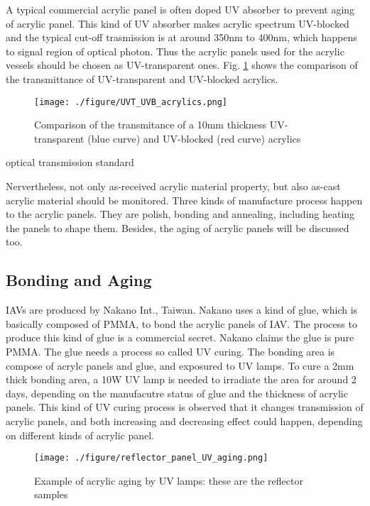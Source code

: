 A typical commercial acrylic panel is often doped UV absorber
to prevent aging of acrylic panel. This kind of UV absorber makes acrylic spectrum
UV-blocked and the typical cut-off trasmission is at around 350nm to 400nm,
which happens to signal region of optical photon.
Thus the acrylic panels used for the acrylic vessels should be chosen as
UV-transparent ones. Fig. \ref{UVTUVBAcrylics} shows the comparison of the transmittance of UV-transparent
and UV-blocked acrylics.


\begin{figure}
    \centering
    \texttt{[image: ./figure/UVT\_UVB\_acrylics.png]}
    \caption{Comparison of the transmitance of a 10mm thickness UV-transparent (blue curve) and UV-blocked (red curve) acrylics}
    \label{UVTUVBAcrylics}
    \end{figure}



optical transmission standard

Nervertheless, not only as-received acrylic material property, but also as-cast
acrylic material should be monitored. Three kinds of manufacture process happen to the acrylic panels.
They are polish, bonding and annealing, including heating the panels to shape them. Besides,
the aging of acrylic panels will be discussed too.

\subsection {Bonding and Aging}

IAVs are produced by Nakano Int., Taiwan. Nakano uses a kind of glue, which is basically
composed of PMMA, to bond the acrylic panels of IAV. The process to produce this kind of glue is a commercial
secret. Nakano claims the glue is pure PMMA. The glue needs a process so called UV curing. The bonding area
is compose of acrylc panels and glue, and exposured to UV lamps. To cure a 2mm thick bonding
area, a 10W UV lamp is needed to irradiate the area for around 2 days, depending on the manufacutre status of glue
and the thickness of acrylic panels. This kind of UV curing process is observed that it changes transmission of acrylic panels,
and both increasing and decreasing effect could happen, depending on different kinds of acrylic panel.


\begin{figure}
    \centering
    \texttt{[image: ./figure/reflector\_panel\_UV\_aging.png]}
    \caption{Example of acrylic aging by UV lamps: these are the reflector samples}
    \label{ReflectorAging}
    \end{figure}




